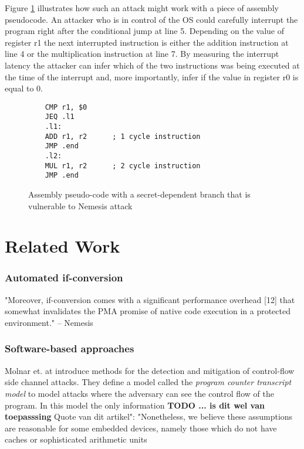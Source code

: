 Figure \ref{fig:pseudo-assembly} illustrates how such an attack might work with a piece of assembly pseudocode. An attacker who is in control of the OS could carefully interrupt the program right
after the conditional jump at line 5. Depending on the value of register r1 the next interrupted instruction is either the addition instruction at line 4 or the multiplication instruction at line 7. 
By measuring the interrupt latency the attacker can infer which of the two instructions was being executed at the time of the interrupt and, more importantly, infer if the value in register r0 is equal to 0. 


\lstset{language=[x64]Assembler, numbers=left, stepnumber=1, frame=single}
\begin{figure}

    \begin{lstlisting}
	CMP r1, $0
	JEQ .l1
	.l1: 
	ADD r1, r2 		; 1 cycle instruction
	JMP .end
	.l2: 
	MUL r1, r2 		; 2 cycle instruction
	JMP .end
	\end{lstlisting}
	\caption{Assembly pseudo-code with a secret-dependent branch that is vulnerable to Nemesis attack}
	\label{fig:pseudo-assembly}
\end{figure}



\section{Related Work}
\subsubsection{Automated if-conversion}
"Moreover, if-conversion comes with a significant performance overhead [12] that somewhat invalidates the
PMA promise of native code execution in a protected environment." -- Nemesis 

\subsubsection{Software-based approaches}

Molnar et. at \cite{programcounter} introduce methods for the detection and mitigation of control-flow side channel attacks.
They define a model called the \textit{program counter transcript model} to model attacks where the adversary can see the control flow of the program. 
In this model the only information 
\textbf{TODO ... is dit wel van toepasssing}
Quote van dit artikel": "Nonetheless, we believe these assumptions are reasonable for some embedded devices, namely those which do not have caches or
sophisticated arithmetic units

